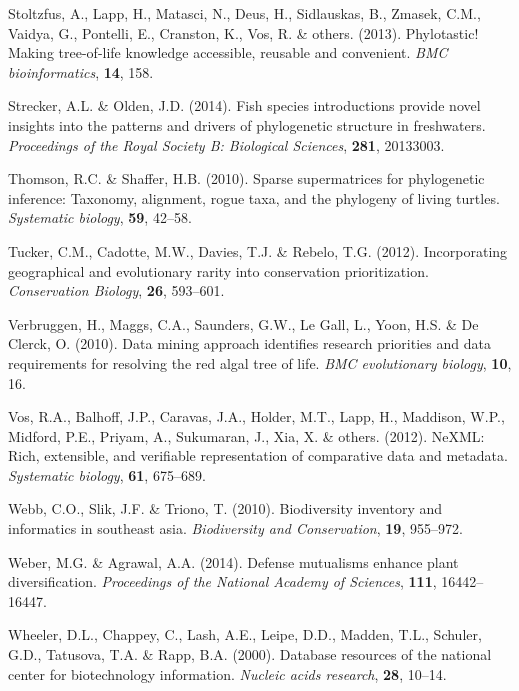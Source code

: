 \documentclass[]{article}
\begin{document}
\leavevmode\hypertarget{ref-stoltzfus2013phylotastic}{}%
Stoltzfus, A., Lapp, H., Matasci, N., Deus, H., Sidlauskas, B., Zmasek, C.M., Vaidya, G., Pontelli, E., Cranston, K., Vos, R. \& others. (2013). Phylotastic! Making tree-of-life knowledge accessible, reusable and convenient. \emph{BMC bioinformatics}, \textbf{14}, 158.

\leavevmode\hypertarget{ref-strecker2014fish}{}%
Strecker, A.L. \& Olden, J.D. (2014). Fish species introductions provide novel insights into the patterns and drivers of phylogenetic structure in freshwaters. \emph{Proceedings of the Royal Society B: Biological Sciences}, \textbf{281}, 20133003.

\leavevmode\hypertarget{ref-thomson2010sparse}{}%
Thomson, R.C. \& Shaffer, H.B. (2010). Sparse supermatrices for phylogenetic inference: Taxonomy, alignment, rogue taxa, and the phylogeny of living turtles. \emph{Systematic biology}, \textbf{59}, 42--58.

\leavevmode\hypertarget{ref-tucker2012incorporating}{}%
Tucker, C.M., Cadotte, M.W., Davies, T.J. \& Rebelo, T.G. (2012). Incorporating geographical and evolutionary rarity into conservation prioritization. \emph{Conservation Biology}, \textbf{26}, 593--601.

\leavevmode\hypertarget{ref-verbruggen2010data}{}%
Verbruggen, H., Maggs, C.A., Saunders, G.W., Le Gall, L., Yoon, H.S. \& De Clerck, O. (2010). Data mining approach identifies research priorities and data requirements for resolving the red algal tree of life. \emph{BMC evolutionary biology}, \textbf{10}, 16.

\leavevmode\hypertarget{ref-vos2012nexml}{}%
Vos, R.A., Balhoff, J.P., Caravas, J.A., Holder, M.T., Lapp, H., Maddison, W.P., Midford, P.E., Priyam, A., Sukumaran, J., Xia, X. \& others. (2012). NeXML: Rich, extensible, and verifiable representation of comparative data and metadata. \emph{Systematic biology}, \textbf{61}, 675--689.

\leavevmode\hypertarget{ref-webb2010biodiversity}{}%
Webb, C.O., Slik, J.F. \& Triono, T. (2010). Biodiversity inventory and informatics in southeast asia. \emph{Biodiversity and Conservation}, \textbf{19}, 955--972.

\leavevmode\hypertarget{ref-weber2014defense}{}%
Weber, M.G. \& Agrawal, A.A. (2014). Defense mutualisms enhance plant diversification. \emph{Proceedings of the National Academy of Sciences}, \textbf{111}, 16442--16447.

\leavevmode\hypertarget{ref-wheeler2000database}{}%
Wheeler, D.L., Chappey, C., Lash, A.E., Leipe, D.D., Madden, T.L., Schuler, G.D., Tatusova, T.A. \& Rapp, B.A. (2000). Database resources of the national center for biotechnology information. \emph{Nucleic acids research}, \textbf{28}, 10--14.
\end{document}
